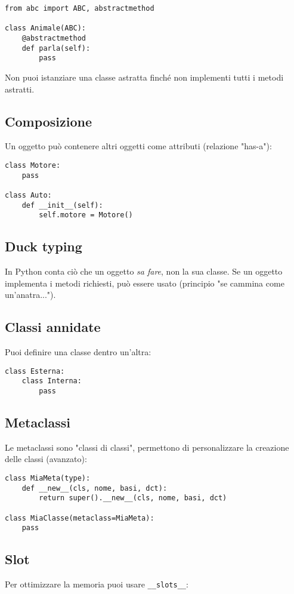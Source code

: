 \documentclass[a4paper,12pt]{article}
\begin{document}
\begin{lstlisting}
from abc import ABC, abstractmethod

class Animale(ABC):
    @abstractmethod
    def parla(self):
        pass
\end{lstlisting}

Non puoi istanziare una classe astratta finché non implementi tutti i metodi astratti.

\subsection*{Composizione}
Un oggetto può contenere altri oggetti come attributi (relazione "has-a"):

\begin{lstlisting}
class Motore:
    pass

class Auto:
    def __init__(self):
        self.motore = Motore()
\end{lstlisting}

\subsection*{Duck typing}
In Python conta ciò che un oggetto \textit{sa fare}, non la sua classe. Se un oggetto implementa i metodi richiesti, può essere usato (principio "se cammina come un'anatra...").

\subsection*{Classi annidate}
Puoi definire una classe dentro un'altra:

\begin{lstlisting}
class Esterna:
    class Interna:
        pass
\end{lstlisting}

\subsection*{Metaclassi}
Le metaclassi sono "classi di classi", permettono di personalizzare la creazione delle classi (avanzato):

\begin{lstlisting}
class MiaMeta(type):
    def __new__(cls, nome, basi, dct):
        return super().__new__(cls, nome, basi, dct)

class MiaClasse(metaclass=MiaMeta):
    pass
\end{lstlisting}

\subsection*{Slot}
Per ottimizzare la memoria puoi usare \texttt{\_\_slots\_\_}:
\end{document}
